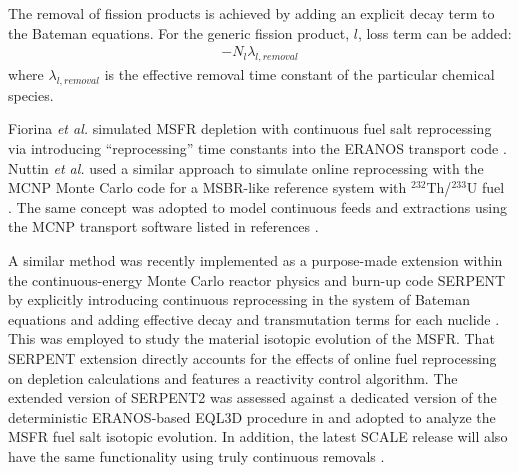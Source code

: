 The removal of fission products is achieved by adding an explicit decay 
term to the Bateman equations. For the generic fission product, $l$, 
loss term can be added:
\begin{align} 
- N_{l}\lambda_{l,removal}  \label{eq:rem_term}
\end{align}
where $\lambda_{l,removal}$ is the effective removal time constant of the particular chemical species. 

Fiorina \emph{et al.} simulated \gls{MSFR} depletion with continuous fuel 
salt reprocessing via introducing 
``reprocessing'' time constants into the ERANOS transport code 
\cite{fiorina_investigation_2013}. Nuttin \emph{et al.} used a similar approach 
to simulate online reprocessing with the MCNP Monte Carlo code for a 
\gls{MSBR}-like reference 
system with $^{232}$Th/$^{233}$U fuel \cite{nuttin_potential_2005}.
The same concept was adopted to model continuous feeds and extractions 
using the 
MCNP transport software listed in references \cite{doligez_coupled_2014,
heuer_towards_2014}. 

A similar method was recently implemented as a purpose-made extension within 
the continuous-energy Monte Carlo reactor physics and burn-up code 
SERPENT by explicitly introducing 
continuous reprocessing in the system of Bateman equations and adding 
effective decay and transmutation terms for each nuclide 
\cite{aufiero_extended_2013}. This was employed to study the material 
isotopic evolution of the \gls{MSFR}\cite{aufiero_extended_2013}. 
That SERPENT extension \cite{aufiero_extended_2013} directly 
accounts for the effects of online fuel reprocessing on depletion calculations 
and features a reactivity control 
algorithm. The extended version of SERPENT2 was assessed against a dedicated 
version of the deterministic ERANOS-based EQL3D procedure in
\cite{ruggieri_eranos_2006, fiorina_investigation_2013} and adopted to analyze 
the \gls{MSFR} fuel salt isotopic evolution. In addition, the latest SCALE release 
will also have the same functionality using truly continuous removals \cite{betzler_implementation_2017}. 

